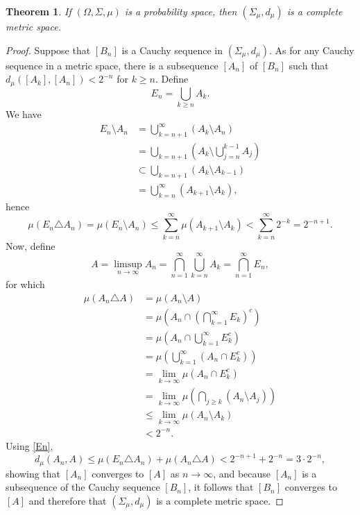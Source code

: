\documentclass{article}
\newtheorem{theorem}{Theorem}
\theoremstyle{definition}
\begin{document}
\begin{theorem}
If $(\Omega,\Sigma,\mu)$ is a probability space, then 
$(\Sigma_\mu, d_\mu)$ is a complete metric space.
\end{theorem}
\begin{proof}
Suppose that $[B_n]$ is a Cauchy sequence in 
$(\Sigma_\mu, d_\mu)$. As for any Cauchy sequence in a metric space, there is a subsequence $[A_n]$ of
$[B_n]$
such that $d_\mu([A_k],[A_n]) < 2^{-n}$ for $k \geq n$. 
Define
\[
E_n = \bigcup_{k \geq n} A_k.
\]
We have
\begin{align*}
E_n \setminus A_n &=\bigcup_{k=n+1}^\infty (A_k \setminus A_n)\\
&=\bigcup_{k=n+1} \left(A_k \setminus \bigcup_{j=n}^{k-1} A_j \right)\\
&\subset \bigcup_{k=n+1} (A_k \setminus A_{k-1})\\
&= \bigcup_{k=n}^\infty (A_{k+1} \setminus A_k),
\end{align*}
hence
\begin{equation}
\mu(E_n \triangle A_n)= \mu(E_n \setminus A_n)
\leq \sum_{k=n}^\infty \mu(A_{k+1} \setminus A_k)
<\sum_{k=n}^\infty 2^{-k}
=2^{-n+1}.
\label{En}
\end{equation}
Now, define
\[
A = \limsup_{n \to \infty} A_n = \bigcap_{n=1}^\infty \bigcup_{k=n}^\infty A_k =
\bigcap_{n=1}^\infty E_n,
\]
for which
\begin{align*}
\mu(A_n \triangle A)&=\mu(A_n \setminus A)\\
&=\mu\left(A_n \cap \left( \bigcap_{k=1}^\infty E_k \right)^c \right)\\
&=\mu\left( A_n \cap \bigcup_{k=1}^\infty E_k^c \right)\\
&=\mu\left( \bigcup_{k=1}^\infty (A_n \cap E_k^c) \right)\\
&= \lim_{k \to \infty} \mu(A_n \cap E_k^c)\\
&=\lim_{k \to \infty} \mu\left( \bigcap_{j \geq k} (A_n \setminus A_j) \right)\\
&\leq \lim_{k \to \infty} \mu(A_n \setminus A_k)\\
&<2^{-n}.
\end{align*}
Using \eqref{En},
\[
d_\mu(A_n,A) \leq 
\mu(E_n \triangle A_n) + \mu(A_n \triangle A) 
< 2^{-n+1}+2^{-n}=3 \cdot 2^{-n},
\]
showing that $[A_n]$ converges to $[A]$ 
as $n \to \infty$, and because $[A_n]$ is a subsequence of the Cauchy
sequence $[B_n]$, it follows that $[B_n]$ converges to $[A]$ and therefore
that $(\Sigma_\mu,d_\mu)$ is a complete metric space.
\end{proof}
\end{document}
